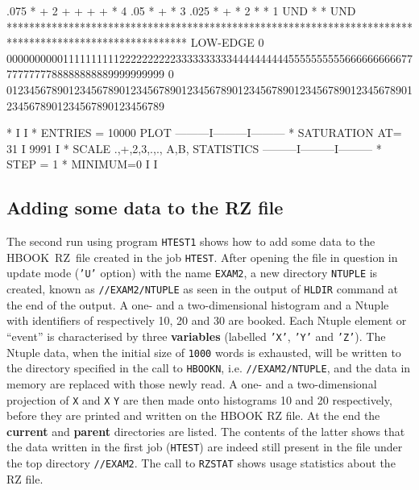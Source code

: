 \begin{minipage}[t]{.495\textwidth}
\begin{XMPfrac}{3.2}
     .075  *                       + 2  +     +                          +                               +        *   4
     .05   *                                      +                                                               *   3
     .025  *                                                                         +                            *   2
           *                                                                                                      *   1
  UND      *                                                                                                      * UND
           ********************************************************************************************************
LOW-EDGE   0 0000000000111111111122222222223333333333444444444455555555556666666666777777777788888888889999999999
           0 0123456789012345678901234567890123456789012345678901234567890123456789012345678901234567890123456789
 
 *                                                          I         I
 * ENTRIES =    10000                   PLOT       ---------I---------I---------
 * SATURATION  AT=           31                             I 9991    I
 * SCALE  .,+,2,3,.,., A,B,           STATISTICS   ---------I---------I---------
 * STEP =    1     * MINIMUM=0                              I         I
\end{XMPfrac}
\end{minipage}

\subsection{Adding some data to the RZ file}

The second run using program \texttt{HTEST1} shows
how to add some data to the HBOOK~RZ~file
created in the job \texttt{HTEST}. After opening the file
in question in update mode (\texttt{'U'} option) with the
name \texttt{EXAM2}, a new directory \texttt{NTUPLE} is created,
known as \texttt{//EXAM2/NTUPLE} as seen in the output of
\texttt{HLDIR} command at the end of the output.
A one- and a two-dimensional
histogram and a Ntuple with identifiers of respectively 10, 20 and 30
are booked.
Each Ntuple element or ``event''
is characterised by three {\bf variables}
(labelled \texttt{'X'}, \texttt{'Y'} and \texttt{'Z'}).
The Ntuple data, when the initial size of \texttt{1000}
words is exhausted, will be written to the directory specified in the
call to \texttt{HBOOKN}, i.e. \texttt{//EXAM2/NTUPLE},
and the data in memory are replaced with those newly read.
A one- and a two-dimensional projection
of \texttt{X} and \texttt{X} \texttt{Y} are then made onto histograms
10 and 20 respectively, before they are printed and written on the
HBOOK RZ file. At the end the {\bf current} and {\bf parent}
directories are listed.
The contents of the latter shows that the data written in
the first job (\texttt{HTEST}) are indeed still present in the file
under the top directory \texttt{//EXAM2}.
The call to \texttt{RZSTAT} shows usage statistics about the RZ file.

